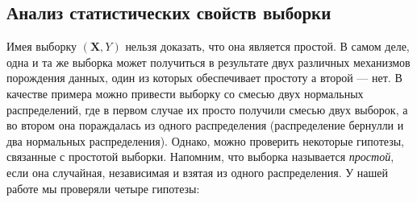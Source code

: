 \documentclass[12pt, fleqn, unicode]{article}
\newcommand{\bX}{\mathbf{X}}
\begin{document}
\subsection{Анализ статистических свойств выборки}

Имея выборку $(\bX, Y)$ нельзя доказать, что она является простой. В самом деле,
одна и та же выборка может получиться в результате двух различных механизмов
порождения данных, один из которых обеспечивает простоту а второй — нет. В качестве
примера можно привести выборку со смесью двух нормальных распределений, где в первом
случае их просто получили смесью двух выборок, а во втором она пораждалась
из одного распределения (распределение бернулли и два нормальных распределения).
Однако, можно проверить некоторые гипотезы, связанные с простотой выборки. Напомним,
что выборка называется \textit{простой}, если она случайная, независимая
и взятая из одного распределения. У нашей работе мы проверяли четыре гипотезы:
\end{document}
